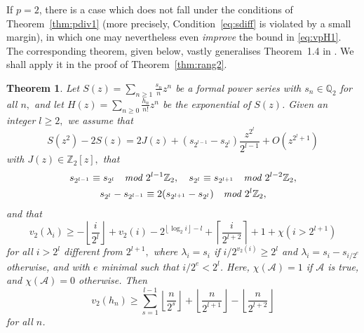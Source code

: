 \documentclass[12pt,reqno]{amsart}
\numberwithin{equation}{section}
\newtheorem{theorem}{Theorem}
\theoremstyle{remark}
\begin{document}
If $p=2$, there is a case which does not fall under
the conditions of Theorem~\ref{thm:pdiv1} (more precisely, 
Condition~\eqref{eq:sdiff} is violated by a small margin), in which one may
nevertheless even {\it improve} the bound in \eqref{eq:vpH1}. The corresponding
theorem, given below, vastly generalises Theorem~1.4 in \cite{KaTYAA}.
We shall apply it in the proof of Theorem~\ref{thm:rang2}. 

\begin{theorem} \label{thm:pdiv12}
Let\/ $S(z)=\sum_{n\ge1}\frac {s_n} {n}z^n$ be a formal power series
with $s_n\in{\mathbb{Q}}_2$ for all $n,$ and let 
$H(z)=\sum_{n\ge0}\frac {h_n} {n!}z^n$ be the exponential of $S(z)$.
Given an integer $l\ge2,$ we assume that
\begin{equation} \label{eq:pS12}
S(z^{2})-2S(z)=2J(z)+(s_{2^{l-1}}-s_{2^l})\frac {z^{2^l}} {2^{l-1}}
+O\left(z^{2^{l}+1}\right) 
\end{equation}
with $J(z)\in {\mathbb{Z}}_2[z],$ that
\begin{gather} \label{eq:p^m2a} 
s_{2^{l-1}}\equiv s_{2^{l}}\quad 
\text{\em mod~$2^{l-1}{\mathbb{Z}}_2$},
\quad 
s_{2^{l}}\equiv s_{2^{l+1}}\quad 
\text{\em mod~$2^{l-2}{\mathbb{Z}}_2$},
\\
\label{eq:p^m2b} 
s_{2^{l}}-s_{2^{l-1}}\equiv 2(s_{2^{l+1}}-s_{2^{l}})\quad 
\text{\em mod~$2^{l}{\mathbb{Z}}_2$},
\end{gather}
and that
\begin{equation} \label{eq:sdiff2} 
v_2({\lambda}_{i})\ge -{\left\lfloor{\frac {i} {2^{l}}}\right\rfloor}
+v_2(i)-2^{{\left\lfloor{\log_2i}\right\rfloor}-l}+{\left\lceil{\frac {i} {2^{l+2}}}\right\rceil}+1
+\chi(i>2^{l+1})
\end{equation}
for all $i>2^{l}$ different from $2^{l+1},$ 
where ${\lambda}_i=s_i$ if $i/2^{v_2(i)}\ge 2^l$
and ${\lambda}_i=s_i-s_{i/2^{e}}$ otherwise, and with $e$ minimal such
that $i/2^e< 2^l$. 
Here, $\chi(\mathcal A)=1$
if $\mathcal A$ is true, and $\chi(\mathcal A)=0$ otherwise.
Then
\begin{equation} \label{eq:vpH12}
v_2(h_n)\ge \sum_{s=1}^{l-1} {\left\lfloor{\frac{n}{2^s}}\right\rfloor}
+{\left\lfloor{\frac {n} {2^{l+1}}}\right\rfloor}-{\left\lfloor{\frac {n} {2^{l+2}}}\right\rfloor}
\end{equation}
for all $n$.


\end{theorem}
\end{document}
